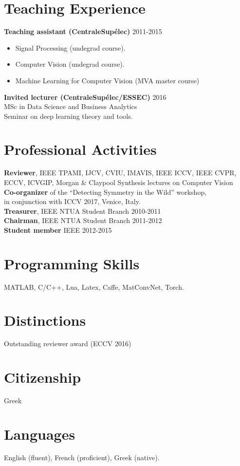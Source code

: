 \documentclass[margin]{res}
\begin{document}
\begin{resume}
\section{Teaching Experience} 
	\textbf{Teaching assistant (CentraleSup\'elec)}   \hfill 2011-2015 
	\begin{itemize}
		\item Signal Processing  (undegrad course).  
		\item Computer Vision  (undegrad course).
		\item Machine Learning for Computer Vision (MVA master course)
	\end{itemize}
	\textbf{Invited lecturer (CentraleSup\'elec/ESSEC)} \hfill 2016 \\
	MSc in Data Science and Business Analytics \\
	Seminar on deep learning theory and tools.


\section{Professional Activities} 
	\textbf{Reviewer}, IEEE TPAMI, IJCV, CVIU, IMAVIS, IEEE ICCV, IEEE CVPR, ECCV, ICVGIP,
	Morgan \& Claypool Synthesis lectures on Computer Vision \\
	\textbf{Co-organizer} of the ``Detecting Symmetry in the Wild'' workshop, \\
	in conjunction with ICCV 2017, Venice, Italy. \\
	\textbf{Treasurer}, IEEE NTUA Student Branch \hfill 2010-2011 \\
	\textbf{Chairman}, IEEE NTUA Student Branch \hfill 2011-2012 \\
	\textbf{Student member} IEEE \hfill 2012-2015

\section{Programming Skills} MATLAB, C/C++, Lua, Latex, Caffe, MatConvNet, Torch. 
\newline

\section{Distinctions} Outstanding reviewer award (ECCV 2016)
\section{Citizenship} Greek
\section{Languages} English (fluent), French (proficient), Greek (native).
 
\end{resume}
\end{document}
